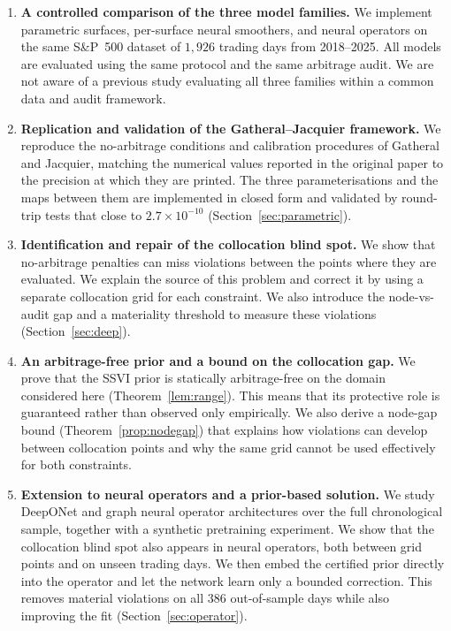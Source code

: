 \begin{enumerate}[label=(\roman*)]

\item \textbf{A controlled comparison of the three model families.} We implement parametric surfaces, per-surface neural smoothers, and neural operators on the same S\&P~500 dataset of $1{,}926$ trading days from 2018--2025. All models are evaluated using the same protocol and the same arbitrage audit. We are not aware of a previous study evaluating all three families within a common data and audit framework.

\item \textbf{Replication and validation of the Gatheral--Jacquier framework.} We reproduce the no-arbitrage conditions and calibration procedures of Gatheral and Jacquier, matching the numerical values reported in the original paper to the precision at which they are printed. The three parameterisations and the maps between them are implemented in closed form and validated by round-trip tests that close to $2.7\times10^{-10}$ (Section~\ref{sec:parametric}).

\item \textbf{Identification and repair of the collocation blind spot.} We show that no-arbitrage penalties can miss violations between the points where they are evaluated. We explain the source of this problem and correct it by using a separate collocation grid for each constraint. We also introduce the node-vs-audit gap and a materiality threshold to measure these violations (Section~\ref{sec:deep}).

\item \textbf{An arbitrage-free prior and a bound on the collocation gap.} We prove that the SSVI prior is statically arbitrage-free on the domain considered here (Theorem~\ref{lem:range}). This means that its protective role is guaranteed rather than observed only empirically. We also derive a node-gap bound (Theorem~\ref{prop:nodegap}) that explains how violations can develop between collocation points and why the same grid cannot be used effectively for both constraints.

\item \textbf{Extension to neural operators and a prior-based solution.} We study DeepONet and graph neural operator architectures over the full chronological sample, together with a synthetic pretraining experiment. We show that the collocation blind spot also appears in neural operators, both between grid points and on unseen trading days. We then embed the certified prior directly into the operator and let the network learn only a bounded correction. This removes material violations on all $386$ out-of-sample days while also improving the fit (Section~\ref{sec:operator}).


\end{enumerate}
